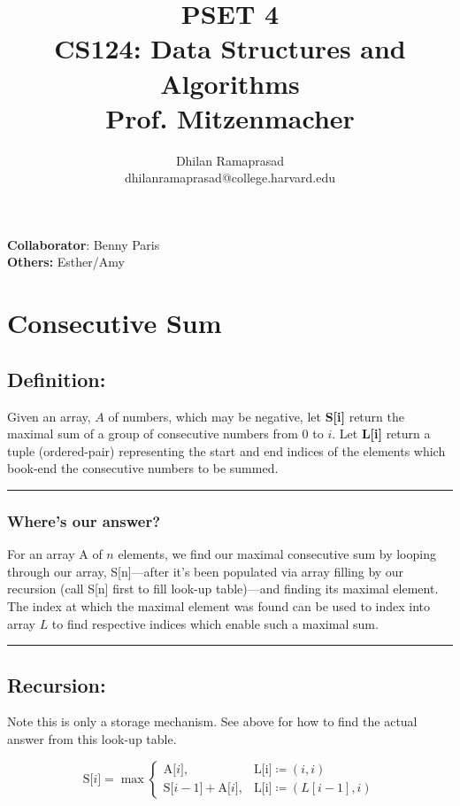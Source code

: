 \documentclass[conference]{styles/acmsiggraph}
\title{\huge PSET 4 \\ \LARGE {CS124: Data Structures and Algorithms \\ Prof. Mitzenmacher}}
\author{\Large Dhilan Ramaprasad \\ dhilanramaprasad@college.harvard.edu}
\newcommand{\?}{\stackrel{?}{=}}
\begin{document}
\maketitle

\textbf{Collaborator}: Benny Paris \\
\textbf{Others:} Esther/Amy

\newpage



\section{Consecutive Sum}

\subsection{Definition:}
Given an array, $A$ of numbers, which may be negative, let \textbf{S[i]} return the maximal sum of a group of consecutive numbers from $0$ to $i$.  Let \textbf{L[i]} return a tuple (ordered-pair) representing the start and end indices of the elements which book-end the consecutive numbers to be summed.\\

\rule{\textwidth}{0.4pt}
\subsubsection*{Where's our answer?}
For an array A of $n$ elements, we find our maximal consecutive sum by looping through our array, S[n]---after it's been populated via array filling by our recursion (call S[n] first to fill look-up table)---and finding its maximal element.  The index at which the maximal element was found can be used to index into array $L$ to find respective indices which enable such a maximal sum. \\
\rule{\textwidth}{0.4pt}


\subsection{Recursion:}
Note this is only a storage mechanism.  See above for how to find the actual answer from this look-up table.

$$\text{S[$i$]} = 
\max\begin{cases}
\text{A[$i$]}, & \text{L[i]} \coloneq (i,i) \\
\text{S[$i-1$]}+\text{A[$i$]}, & \text{L[i]} \coloneq (L[i-1],i)
\end{cases}$$
\end{document}
